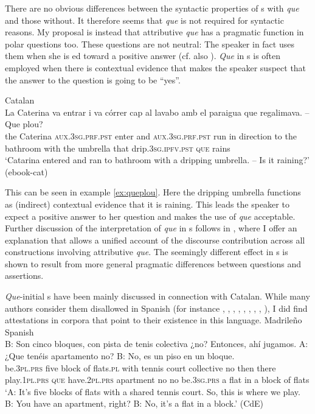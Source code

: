 There are no obvious differences between the syntactic properties of s with  \emph{que} and those without. It therefore seems that \emph{que} is not  required  for syntactic reasons. My proposal is instead that attributive \emph{que} has a pragmatic function in polar questions too. These questions are not neutral: The speaker in fact uses them when she is ed toward a positive answer (cf. also \citealt{Kocher2017a}). \emph{Que} in s  is often employed when there is  contextual evidence that makes the speaker suspect that the answer to the question is going to be ``yes''.

\ea\label{ex:queplou}
Catalan\\
\gll La Caterina va entrar i va córrer cap al lavabo amb el paraigua que regalimava. -- Que plou? \\
the Caterina \textsc{aux.3sg.prf.pst} enter and \textsc{aux.3sg.prf.pst} run {in direction} {to the} bathroom with the umbrella that drip.\textsc{3sg.ipfv.pst} {} \textsc{que} rains\\
\glt `Catarina entered and ran to bathroom with a dripping umbrella. -- Is it raining?' (ebook-cat)
\z

This can be seen in example  \eqref{ex:queplou}. Here the dripping umbrella functions as (indirect) contextual evidence  that it is raining. This  leads the speaker to expect a positive answer to her question and makes  the use of \emph{que} acceptable. Further discussion of the interpretation of \emph{que} in s follows in , where  I  offer an explanation that allows a unified account of the discourse contribution across all constructions involving attributive \emph{que}.  The seemingly different effect in s is shown to result from more general pragmatic differences between  questions and assertions.

\emph{Que}-initial s have been mainly discussed in connection with Catalan. While many authors consider them disallowed in Spanish (for instance \citealt{Mioto2003}, \citealt{PrietoRigau2007},  \citealt{Rodriguez-Ramalle2007}, \citealt{Etxepare2008}, \citealt{DemonteSoriano2009}, \citealt{Gras2010},    \citealt{GonzalesPlanas2014}, \citealt{VillaGarcia2015}, \citealt{Corr2016}),  I did find attestations in corpora that point to their existence in this language.
\ea\label{ex:quepqsp} Madrileño Spanish\\ \gll  B: Son cinco bloques, con {pista de tenis} colectiva ¿no? Entonces, ahí jugamos. A: ¿Que tenéis apartamento no? B: No, es un piso en un bloque.    \\
 {} be.\textsc{3pl.prs} five {block of flats.\textsc{pl}} with {tennis court} collective no then there play.\textsc{1pl.prs} {}  \textsc{que} have.\textsc{2pl.prs} apartment no  {} no be.\textsc{3sg.prs} a flat in a {block of flats}  \\
\glt `A: It's five blocks of flats with a shared tennis court. So, this is where we play. B: You have an apartment, right? B: No, it's a flat in a block.' (CdE)
\z

